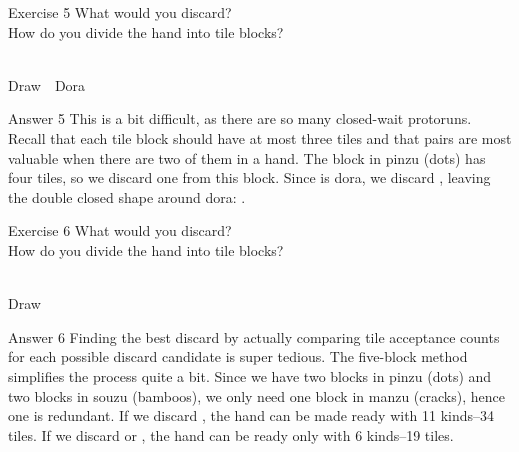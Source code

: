 \vfill


\begin{itembox}[l]{Exercise 5}
What would you discard? \\
\vsp
How do you divide the hand into tile blocks? 

\bp
{}~~\\
\hfill\footnotesize{Draw~~{\jap Dora}~~~~~~~}
\ep
\end{itembox}

\newpage

\begin{itembox}[r]{Answer 5}
\emj
This is a bit difficult, as there are so many closed-wait protoruns. Recall that each tile block should have at most three tiles and that pairs are most valuable when there are two of them in a hand. 
The block in {\jap pinzu} (dots) has four tiles, so we discard one from this block. Since {\LARGE{}} is {\jap dora}, we discard {\LARGE{}}, leaving the double closed shape around {\jap dora}: {\LARGE{}}. 
\end{itembox}

\vfill

\begin{itembox}[l]{Exercise 6}
What would you discard? \\
\vsp
How do you divide the hand into tile blocks? 

\bp
{}~\\
\hfill\footnotesize{Draw~~~~~~~~~~~}
\ep
\end{itembox}

\newpage

\begin{itembox}[r]{Answer 6}
\emj
Finding the best discard by actually comparing tile acceptance counts for each possible discard candidate is super tedious. The five-block method simplifies the process quite a bit. Since we have two blocks in {\jap pinzu} (dots) and two blocks in {\jap souzu} (bamboos), we only need one block in {\jap manzu} (cracks), hence one {\LARGE{}} is redundant. If we discard {\LARGE{}}, the hand can be made ready with 11 kinds--34 tiles. If we discard {\LARGE{} } or {\LARGE{}}, the hand can be ready only with 6 kinds--19 tiles. 
\end{itembox}


